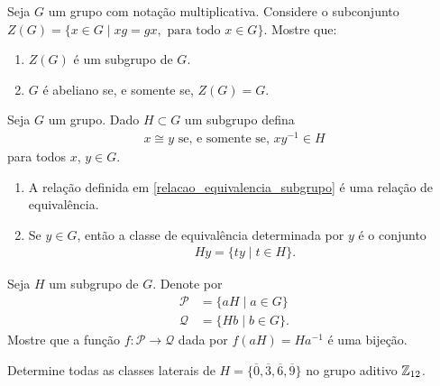 \documentclass[12pt]{exam}
\begin{document}
    \vspace{.3cm}

    \questao{} Seja $G$ um grupo com nota\c{c}\~ao multiplicativa. Considere o subconjunto $Z(G) = \{x \in G \mid xg = gx, \mbox{ para todo } x \in G\}$. Mostre que:
    \begin{enumerate}[label=({\alph*})]
      \item $Z(G)$ \'e um subgrupo de $G$.
      \item $G$ \'e abeliano se, e somente se, $Z(G) = G$.
    \end{enumerate}

    \vspace{.3cm}

    \questao{} Seja $G$ um grupo. Dado $H \subset G$ um subgrupo defina
    \begin{align}\label{relacao_equivalencia_subgrupo}
        x \cong y \mbox{ se, e somente se, } xy^{-1} \in H
    \end{align}
    para todos $x$, $y \in G$.
    \begin{enumerate}[label={\alph*})]
        \item A rela\c{c}\~ao definida em \eqref{relacao_equivalencia_subgrupo} \'e uma rela\c{c}\~ao de equival\^encia.

        \item Se $y \in G$, ent\~ao a classe de equival\^encia determinada por $y$ \'e o conjunto
        \begin{align*}\label{classe_equivalencia_subgrupo}
            Hy = \{ty \mid t \in H\}.
        \end{align*}
    \end{enumerate}

    \vspace{.3cm}

    \questao{} Seja $H$ um subgrupo de $G$. Denote por
    \begin{align*}
        \mathcal{P} &= \{aH \mid a \in G\}\\
        \mathcal{Q} &= \{Hb \mid b \in G\}.
    \end{align*}
    Mostre que a função $f : \mathcal{P} \to \mathcal{Q}$ dada por $f(aH) = Ha^{-1}$ é uma bijeção.

    \vspace{.3cm}

    \questao{} Determine todas as classes laterais de $H = \{\overline{0}, \overline{3}, \overline{6}, \overline{9}\}$ no grupo aditivo $\mathbb{Z}_{12}$.

    \vspace{.3cm}
\end{document}
